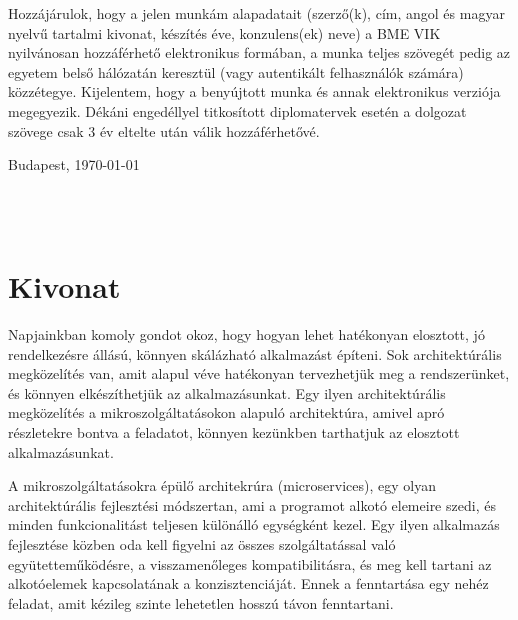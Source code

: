 \documentclass[11pt,magyar,a4paper,twoside,]{report}
\begin{document}
Hozzájárulok, hogy a jelen munkám alapadatait (szerző(k), cím, angol és magyar nyelvű tartalmi kivonat, készítés éve, konzulens(ek) neve) a BME VIK nyilvánosan hozzáférhető elektronikus formában, a munka teljes szövegét pedig az egyetem belső hálózatán keresztül (vagy autentikált felhasználók számára) közzétegye. Kijelentem, hogy a benyújtott munka és annak elektronikus verziója megegyezik. Dékáni engedéllyel titkosított diplomatervek esetén a dolgozat szövege csak 3 év eltelte után válik hozzáférhetővé.

\begin{flushleft}
\vspace*{1cm}
Budapest, \today
\end{flushleft}

\begin{flushright}
 \vspace*{1cm}
 \makebox[7cm]{\rule{6cm}{.4pt}}\\
 \\
\end{flushright}
\thispagestyle{empty}

\vfill
\clearpage
\thispagestyle{empty} %

\chapter*{Kivonat}\label{kivonat}

Napjainkban komoly gondot okoz, hogy hogyan lehet hatékonyan elosztott,
jó rendelkezésre állású, könnyen skálázható alkalmazást építeni. Sok
architektúrális megközelítés van, amit alapul véve hatékonyan
tervezhetjük meg a rendszerünket, és könnyen elkészíthetjük az
alkalmazásunkat. Egy ilyen architektúrális megközelítés a
mikroszolgáltatásokon alapuló architektúra, amivel apró részletekre
bontva a feladatot, könnyen kezünkben tarthatjuk az elosztott
alkalmazásunkat.

A mikroszolgáltatásokra épülő architekrúra (microservices), egy olyan
architektúrális fejlesztési módszertan, ami a programot alkotó elemeire
szedi, és minden funkcionalitást teljesen különálló egységként kezel.
Egy ilyen alkalmazás fejlesztése közben oda kell figyelni az összes
szolgáltatással való együtetteműködésre, a visszamenőleges
kompatibilitásra, és meg kell tartani az alkotóelemek kapcsolatának a
konzisztenciáját. Ennek a fenntartása egy nehéz feladat, amit kézileg
szinte lehetetlen hosszú távon fenntartani.
\end{document}
